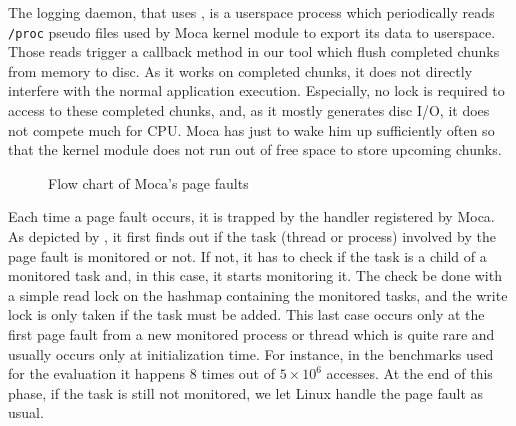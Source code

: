 The logging daemon, that uses , is a userspace process which periodically reads \texttt{/proc} pseudo files used by \gls{Moca} kernel module to export its data to userspace.
Those reads trigger a callback method in our tool which flush completed chunks from memory to disc.
As it works on completed chunks, it does not directly interfere with the normal application execution.
Especially, no lock is required to access to these completed chunks, and, as it mostly generates disc I/O, it does not compete much for CPU.
\gls{Moca} has just to wake him up sufficiently often so that the kernel module does not run out of free space to store upcoming chunks.


\begin{figure}[htb]
    \centering
    
    \caption{Flow chart of Moca's page faults}
    \label{fig:fpf-flow}
\end{figure}

Each time a page fault occurs, it is trapped by the handler registered by \gls{Moca}.
As depicted by , it first finds out if the task (thread or process) involved by the page fault is monitored or not.
If not, it has to check if the task is a child of a monitored task and, in this case, it starts monitoring it.
The check be done with a simple read lock on the hashmap containing the monitored tasks, and the write lock is only taken if the task must be added.
This last case occurs only at the first page fault from a new monitored process or thread which is quite rare and usually occurs only at initialization time.
For instance, in the benchmarks used for the evaluation it happens $8$ times out of $5\times10^6$ accesses.
At the end of this phase, if the task is still not monitored, we let Linux handle the page fault as usual.

